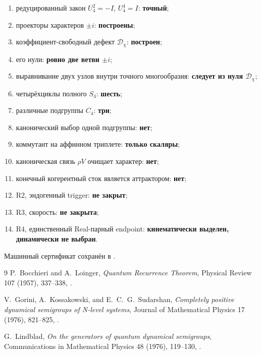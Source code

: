 \begin{protocol}
\begin{enumerate}
 \item редуцированный закон $U_4^2=-I$, $U_4^4=I$: \textbf{точный};
 \item проекторы характеров $\pm i$: \textbf{построены};
 \item коэффициент-свободный дефект $\mathcal D_\chi$: \textbf{построен};
 \item его нули: \textbf{ровно две ветви $\pm i$};
 \item выравнивание двух узлов внутри точного многообразия:
 \textbf{следует из нуля $\mathcal D_\chi$};
 \item четырёхциклы полного $S_4$: \textbf{шесть};
 \item различные подгруппы $C_4$: \textbf{три};
 \item канонический выбор одной подгруппы: \textbf{нет};
 \item коммутант на аффинном триплете: \textbf{только скаляры};
 \item каноническая связь $\rho V$ очищает характер: \textbf{нет};
 \item конечный когерентный сток является аттрактором: \textbf{нет};
 \item R2, эндогенный trigger: \textbf{не закрыт};
 \item R3, скорость: \textbf{не закрыта};
 \item R4, единственный Real-парный endpoint: \textbf{кинематически выделен,
 динамически не выбран}.
\end{enumerate}
\end{protocol}

Машинный сертификат сохранён в
.

\begin{thebibliography}{9}
P.~Bocchieri and A.~Loinger,
\emph{Quantum Recurrence Theorem},
Physical Review 107 (1957), 337--338,
.

V.~Gorini, A.~Kossakowski, and E.~C.~G.~Sudarshan,
\emph{Completely positive dynamical semigroups of N-level systems},
Journal of Mathematical Physics 17 (1976), 821--825,
.

G.~Lindblad,
\emph{On the generators of quantum dynamical semigroups},
Communications in Mathematical Physics 48 (1976), 119--130,
.
\end{thebibliography}